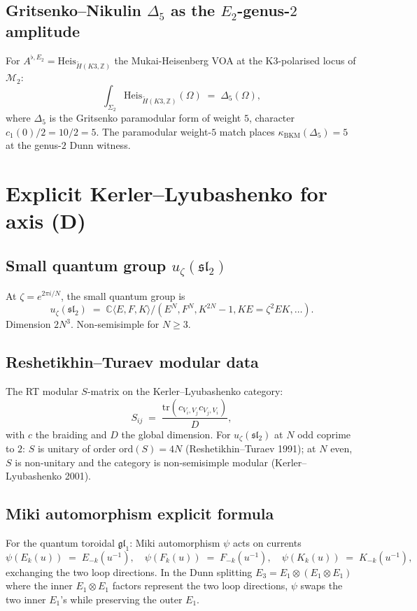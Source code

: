 \documentclass[11pt]{article}
\newcommand{\Eone}{E_{1}}
\newcommand{\Etwo}{E_{2}}
\newcommand{\Ethree}{E_{3}}
\newcommand{\C}{\mathbb{C}}
\newcommand{\Z}{\mathbb{Z}}
\newcommand{\cM}{\mathcal{M}}
\newcommand{\fgl}{\mathfrak{gl}}
\newcommand{\fsl}{\mathfrak{sl}}
\begin{document}
\subsection{Gritsenko--Nikulin $\Delta_5$ as the $\Etwo$-genus-$2$ amplitude}

For $A^{\flat, \Etwo} = \mathrm{Heis}_{\widetilde H(K3, \Z)}$ the
Mukai-Heisenberg VOA at the K3-polarised locus of $\cM_2$:
\[
  \int_{\Sigma_2} \mathrm{Heis}_{\widetilde H(K3, \Z)}(\Omega)
  \;=\;
  \Delta_5(\Omega),
\]
where $\Delta_5$ is the Gritsenko paramodular form of weight $5$,
character $c_1(0)/2 = 10/2 = 5$. The paramodular weight-$5$ match
places $\kappa_{\mathrm{BKM}}(\Delta_5) = 5$ at the genus-$2$ Dunn
witness.

\section{Explicit Kerler--Lyubashenko for axis (D)}
\label{app:kl-D}

\subsection{Small quantum group $u_\zeta(\fsl_2)$}

At $\zeta = e^{2\pi i/N}$, the small quantum group is
\[
  u_\zeta(\fsl_2) \;=\; \C\langle E, F, K\rangle / (E^N, F^N, K^{2N} - 1, KE = \zeta^2 EK, \ldots).
\]
Dimension $2N^3$. Non-semisimple for $N \geq 3$.

\subsection{Reshetikhin--Turaev modular data}

The RT modular $S$-matrix on the Kerler--Lyubashenko category:
\[
  S_{i j} \;=\; \frac{\mathrm{tr}(c_{V_i, V_j} c_{V_j, V_i})}{D},
\]
with $c$ the braiding and $D$ the global dimension. For $u_\zeta(\fsl_2)$ at
$N$ odd coprime to $2$: $S$ is unitary of order $\mathrm{ord}(S) = 4N$
(Reshetikhin--Turaev 1991); at $N$ even, $S$ is non-unitary and the
category is non-semisimple modular (Kerler--Lyubashenko 2001).

\subsection{Miki automorphism explicit formula}

For the quantum toroidal $\fgl_1$: Miki automorphism $\psi$ acts on
currents
\[
  \psi(E_k(u)) \;=\; E_{-k}(u^{-1}), \quad
  \psi(F_k(u)) \;=\; F_{-k}(u^{-1}), \quad
  \psi(K_k(u)) \;=\; K_{-k}(u^{-1}),
\]
exchanging the two loop directions. In the Dunn splitting
$\Ethree = \Eone \otimes (\Eone \otimes \Eone)$ where the inner
$\Eone \otimes \Eone$ factors represent the two loop directions,
$\psi$ swaps the two inner $\Eone$'s while preserving the outer
$\Eone$.
\end{document}

